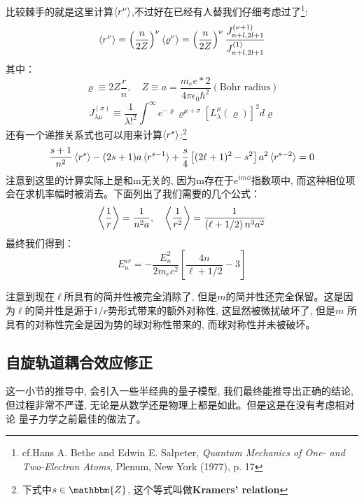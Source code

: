 \documentclass[a4paper,zihao=-4,linespread=1]{ctexrep}
\begin{document}
    比较棘手的就是这里计算$\Braket{r^\nu}$,不过好在已经有人替我们仔细考虑过了\footnote{cf.Hans A. Bethe and Edwin E. Salpeter, {\itshape Quantum Mechanics of
    One- and Two-Electron Atoms}, Plenum, New York (1977), p. 17}:
    \begin{equation}
        \label{eq:7.16}
        \Braket{r^\nu}=\left(\frac{n}{2 Z}\right)^\nu \braket{\varrho^\nu}=\left(\frac{n}{2 Z}\right)^\nu \frac{J_{n+l, 2 l+1}^{(\nu+1)}}{J_{n+l, 2 l+1}^{(1)}}
    \end{equation}
    其中：
    \[\varrho\equiv 2Z\frac{r}{n},\quad Z\equiv a=\frac{m_ee*2}{4\pi\epsilon_0\hbar^2}(\text{Bohr radius})\]
    \[J_{\lambda \mu}^{(\sigma)}\equiv\frac{1}{\lambda !^2} \int^{\infty} e^{-\varrho} \varrho^{\mu+\sigma}\left[L_\lambda^\mu(\varrho)\right]^2 d \varrho\]
    还有一个递推关系式也可以用来计算$\braket{r^s}$:\footnote{下式中$s\in\mathbbm{Z}$, 这个等式叫做\textbf{Kramers’ relation}}
    \begin{equation*}
        \frac{s+1}{n^2}\braket{r^s} -(2 s+1) a\braket{r^{s-1}}+\frac{s}{4}\left[(2 \ell+1)^2-s^2\right] a^2\braket{r^{s-2}}=0
    \end{equation*}
    注意到这里的计算实际上是和m无关的, 因为m存在于$e^{im\phi}$指数项中, 而这种相位项会在求机率幅时被消去。下面列出了我们需要的几个公式：
    \[\Braket{\frac{1}{r}}=\frac{1}{n^2a},\quad\Braket{\frac{1}{r^2}}=\frac{1}{\left(\ell+1/2\right)n^3a^2}\]
    最终我们得到：
    \begin{equation}
        \label{eq:7.17}
        E^{sr}_n=-\frac{E_n^2}{2m_ec^2}\left[\frac{4n}{\ell+1/2}-3\right]
    \end{equation}
    
    注意到现在$\ell$所具有的简并性被完全消除了, 但是$m$的简并性还完全保留。这是因为$\ell$的简并性是源于$1/r$势形式带来的额外对称性, 这显然被微扰破坏了, 但是$m$
    所具有的对称性完全是因为势的球对称性带来的, 而球对称性并未被破坏。
    
    \subsection*{自旋轨道耦合效应修正}
    这一小节的推导中, 会引入一些半经典的量子模型, 我们最终能推导出正确的结论, 但过程非常不严谨, 无论是从数学还是物理上都是如此。但是这是在没有考虑相对论
    量子力学之前最佳的做法了。
\end{document}
